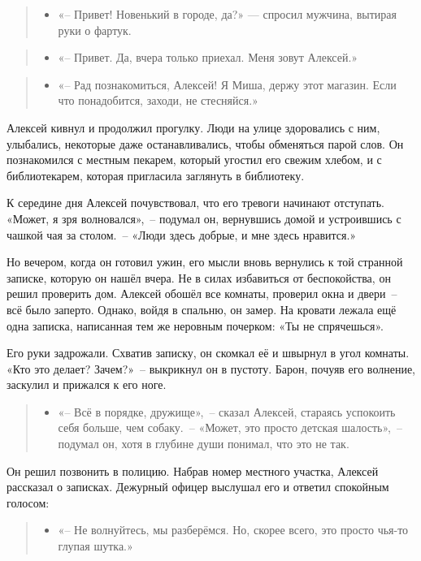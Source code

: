 \documentclass[12pt,a4paper]{book}
\newenvironment{dialogue}{\begin{quote}\itshape\begin{itemize}\item[]}{\end{itemize}\end{quote}}
\begin{document}
\begin{dialogue}
«-- Привет! Новенький в городе, да?» — спросил мужчина, вытирая руки о фартук.
\end{dialogue}

\begin{dialogue}
«-- Привет. Да, вчера только приехал. Меня зовут Алексей.»
\end{dialogue}

\begin{dialogue}
«-- Рад познакомиться, Алексей! Я Миша, держу этот магазин. Если что понадобится, заходи, не стесняйся.»
\end{dialogue}

Алексей кивнул и продолжил прогулку. Люди на улице здоровались с ним, улыбались, некоторые даже останавливались, чтобы обменяться парой слов. Он познакомился с местным пекарем, который угостил его свежим хлебом, и с библиотекарем, которая пригласила заглянуть в библиотеку.

К середине дня Алексей почувствовал, что его тревоги начинают отступать. «Может, я зря волновался»,~-- подумал он, вернувшись домой и устроившись с чашкой чая за столом.~-- «Люди здесь добрые, и мне здесь нравится.»

Но вечером, когда он готовил ужин, его мысли вновь вернулись к той странной записке, которую он нашёл вчера. Не в силах избавиться от беспокойства, он решил проверить дом. Алексей обошёл все комнаты, проверил окна и двери~-- всё было заперто. Однако, войдя в спальню, он замер. На кровати лежала ещё одна записка, написанная тем же неровным почерком: «Ты не спрячешься».

Его руки задрожали. Схватив записку, он скомкал её и швырнул в угол комнаты. «Кто это делает? Зачем?»~-- выкрикнул он в пустоту. Барон, почуяв его волнение, заскулил и прижался к его ноге.

\begin{dialogue}
«-- Всё в порядке, дружище»,~-- сказал Алексей, стараясь успокоить себя больше, чем собаку.~-- «Может, это просто детская шалость»,~-- подумал он, хотя в глубине души понимал, что это не так.
\end{dialogue}

Он решил позвонить в полицию. Набрав номер местного участка, Алексей рассказал о записках. Дежурный офицер выслушал его и ответил спокойным голосом:

\begin{dialogue}
«-- Не волнуйтесь, мы разберёмся. Но, скорее всего, это просто чья-то глупая шутка.»
\end{dialogue}
\end{document}
